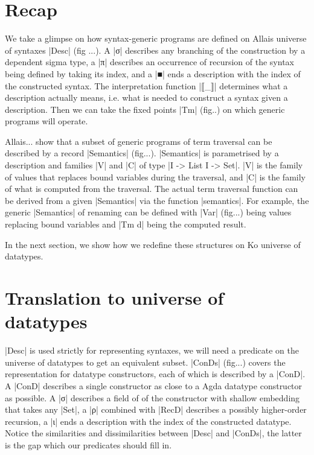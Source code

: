 \documentclass[sigplan,review,fleqn]{acmart}
\renewcommand{\verb}{\collectverb{\color{AgdaFunction}}}
\newcommand{\con}{\collectverb{\color{AgdaInductiveConstructor}}}
\begin{document}
\section{Recap}
We take a glimpse on how syntax-generic programs are defined on Allais universe of syntaxes \verb|Desc| (fig ...).
A \con|σ| describes any branching of the construction by a dependent sigma type, a \con|π| describes an occurrence of recursion of the syntax being defined by taking its index, and a \con|■| ends a description with the index of the constructed syntax.
The interpretation function \verb|⟦_⟧| determines what a description actually means, i.e. what is needed to construct a syntax given a description.
Then we can take the fixed points \verb|Tm| (fig..) on which generic programs will operate.

Allais... show that a subset of generic programs of term traversal can be described by a record \verb|Semantics| (fig...).
\verb|Semantics| is parametrised by a description and families \verb|V| and \verb|C| of type \verb|I -> List I -> Set|.
\verb|V| is the family of values that replaces bound variables during the traversal, and \verb|C| is the family of what is computed from the traversal.
The actual term traversal function can be derived from a given \verb|Semantics| via the function \verb|semantics|.
For example, the generic \verb|Semantics| of renaming can be defined with \verb|Var| (fig...) being values replacing bound variables and \verb|Tm d| being the computed result.

In the next section, we show how we redefine these structures on Ko universe of datatypes. 


\section{Translation to universe of datatypes}
\verb|Desc| is used strictly for representing syntaxes, we will need a predicate on the universe of datatypes to get an equivalent subset.
\verb|ConDs| (fig...) covers the representation for datatype constructors, each of which is described by a \verb|ConD|.
A \verb|ConD| describes a single constructor as close to a Agda datatype constructor as possible.
A \con|σ| describes a field of of the constructor with shallow embedding that takes any \verb|Set|, a \con|ρ| combined with \verb|RecD| describes a possibly higher-order recursion, a \con|ι| ends a description with the index of the constructed datatype.
Notice the similarities and dissimilarities between \verb|Desc| and \verb|ConDs|, the latter is the gap which our predicates should fill in. 
\end{document}
